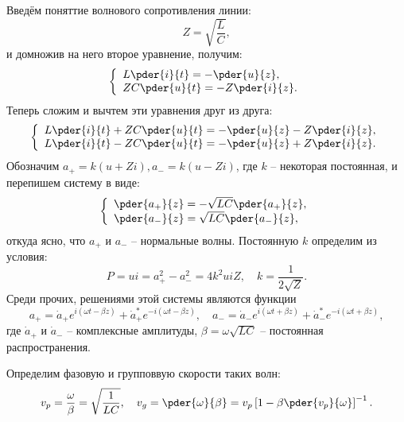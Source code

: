 \documentclass{hedwork}
\begin{document}
Введём поняттие волнового сопротивления линии:
\begin{equation}
    Z = \sqrt{\frac{L}{C}},
\end{equation}
и домножив на него второе уравнение, получим:
\begin{equation}
    \left\{
        \begin{array}{l}
            L\pder{i}{t} = -\pder{u}{z},\\
            ZC\pder{u}{t} = -Z\pder{i}{z}.
    \end{array}
    \right.
\end{equation}
Теперь сложим и вычтем эти уравнения друг из друга:
\begin{equation}
    \left\{
        \begin{array}{l}
            L\pder{i}{t} + ZC\pder{u}{t} = -\pder{u}{z} - Z\pder{i}{z},\\
            L\pder{i}{t} - ZC\pder{u}{t} = -\pder{u}{z} + Z\pder{i}{z}.
    \end{array}
    \right.
\end{equation}
Обозначим \( a_+ = k(u + Zi), a_- = k(u - Zi) \), где \( k \) -- некоторая
постоянная, и перепишем систему в виде:
\begin{equation}
    \left\{
        \begin{array}{l}
            \pder{a_+}{z} = -\sqrt{LC}\pder{a_+}{z},\\
            \pder{a_-}{z} = \sqrt{LC}\pder{a_-}{z},
    \end{array}
    \right.
\end{equation}
откуда ясно, что \( a_+ \) и \( a_- \) -- нормальные волны. Постоянную \( k \)
определим из условия:
\begin{equation}
    P = ui = a_+^2 - a_-^2 = 4k^2uiZ,\quad k = \frac{1}{2\sqrt{Z}}.
\end{equation}
Среди прочих, решениями этой системы являются функции
\begin{equation}
    a_+ = \dot{a}_+e^{i(\omega t - \beta z)} +
          \dot{a}_+^*e^{-i(\omega t - \beta z)},\quad
    a_- = \dot{a}_-e^{i(\omega t + \beta z)} +
          \dot{a}_-^*e^{-i(\omega t + \beta z)},
\end{equation}
где \( \dot{a}_+ \) и \( \dot{a}_- \) -- комплексные амплитуды,
\( \beta = \omega\sqrt{LC} \) -- постоянная распространения.

Определим фазовую и групповвую скорости таких волн:
\begin{equation}
    v_p = \frac{\omega}{\beta} = \sqrt{\frac{1}{LC}},\quad
    v_g = \pder{\omega}{\beta} = v_p\left[1-\beta\pder{v_p}{\omega}\right]^{-1}.
\end{equation}
\end{document}
